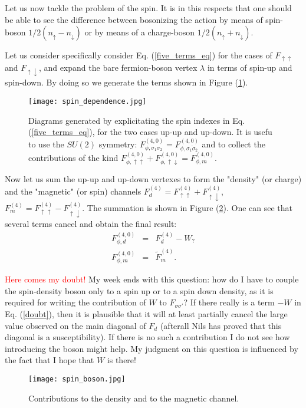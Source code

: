 \documentclass[a4paper,11pt]{article}
\begin{document}
Let us now tackle the problem of the spin. It is in this respects that one should be able to see the difference between bosonizing the action by means of spin-boson $1/2 (n_\uparrow-n_\downarrow)$ or by means of a charge-boson $1/2 (n_\uparrow + n_\downarrow)$.

Let us consider specifically consider Eq. (\ref{five_terms_eq}) for the cases of $F_{\uparrow\uparrow}$ and $F_{\uparrow\downarrow}$, and expand the bare fermion-boson vertex $\lambda$ in terms of spin-up and spin-down. By doing so we generate the terms shown in Figure (\ref{spindependence}). 
\begin{figure}
\texttt{[image: spin\_dependence.jpg]}
\label{spindependence} 
\caption{Diagrams generated by explicitating the spin indexes in Eq. (\ref{five_terms_eq}), for the two cases up-up and up-down. 
It is usefu to use the $SU(2)$ symmetry: $F_{\phi,\sigma_1\sigma_2}^{(4,0)} = F_{\phi,\overline{\sigma_1\sigma_2}}^{(4,0)}   $ and to collect the contributions of the kind $F_{\phi,\uparrow\uparrow}^{(4,0)} +F_{\phi,\uparrow\downarrow}^{(4,0)}=F_{\phi,m}^{(4,0)}$.} 
\end{figure}  

Now let us sum the up-up and up-down vertexes to form the "density" (or charge) and the "magnetic" (or spin) channels\cite{Rohringer2012} $F_d^{(4)} = F_{\uparrow\uparrow}^{(4)}+F_{\uparrow\downarrow}^{(4)}$, $F_m^{(4)} = F_{\uparrow\uparrow}^{(4)}-F_{\uparrow\downarrow}^{(4)}$. 
The summation is shown in Figure (\ref{density_and_magnetic}). One can see that several terms cancel and obtain the final result: 
\begin{eqnarray}
F_{\phi,d}^{(4,0)}  & = & F_d^{(4)} - W_{?} \label{doubt} \\ 
F_{\phi,m}^{(4,0)} & = & \tilde F_m^{(4)}.    
\end{eqnarray}  

\textcolor{red} {Here comes my doubt!} My week ends with this question: how do I have to couple the spin-density boson only to a spin up or to a spin down density, as it is required for writing the contribution of $W$ to $F_{\sigma\sigma'}$? If there really is a term $-W$ in Eq. (\ref{doubt}), then it is plausible that it will at least partially cancel the large value observed on the main diagonal of $F_d$ (afterall Nils has proved that this diagonal is a susceptibility).
If there is no such a contribution I do not see how introducing the boson might help. My judgment on this question is influenced by the fact that I hope that $W$ is there!  

\begin{figure} 
\texttt{[image: spin\_boson.jpg]}
\label{density_and_magnetic}    
\caption{Contributions to the density and to the magnetic channel.} 
\end{figure} 
   


\vfill\eject

 
\end{document}
